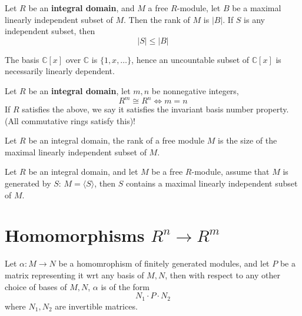 \documentclass[openany]{book}
\newcommand{\C}{\mathbb{C}}
\newcommand{\la}{\langle}
\newcommand{\ra}{\rangle}
\begin{document}
\begin{prop}
    Let $R$ be an \textbf{integral domain}, and $M$ a free $R$-module, let $B$ be a maximal linearly independent subset of $M$. Then the rank of $M$ is $|B|$. If $S$ is any independent subset, then 
    \begin{equation*}
        |S|\leq|B|
    \end{equation*}
\end{prop}
\begin{example}
    The basis $\C[x]$ over $\C$ is $\{1,x,\dots\}$, hence an uncountable subset of $\C[x]$ is necessarily linearly dependent.
\end{example}

\begin{prop}
    Let $R$ be an \textbf{integral domain}, let $m,n$ be nonnegative integers, 
    \begin{equation*}
        R^m \cong R^n\iff m=n
    \end{equation*}
    If $R$ satisfies the above, we say it satisfies the invariant basis number property. (All commutative rings satisfy this)!
\end{prop}

\begin{defn}
    Let $R$ be an integral domain, the rank of a free module $M$ is the size of the maximal linearly independent subset of $M$.
\end{defn}


\begin{prop}
    Let $R$ be an integral domain, and let $M$ be a free $R$-module, assume that $M$ is generated by $S$: $M=\la S\ra$, then $S$ contains a maximal linearly independent subset of $M$.
\end{prop}


\section{Homomorphisms $R^n\to R^m$}

\begin{prop}
    Let $\alpha:M\to N$ be a homomrophism of finitely generated modules, and let $P$ be a matrix representing it wrt any basis of $M,N$, then with respect to any other choice of bases of $M,N$, $\alpha$ is of the form
    \begin{equation*}
        N_1\cdot P\cdot N_2
    \end{equation*}
    where $N_1,N_2$ are invertible matrices.
\end{prop}
\end{document}
